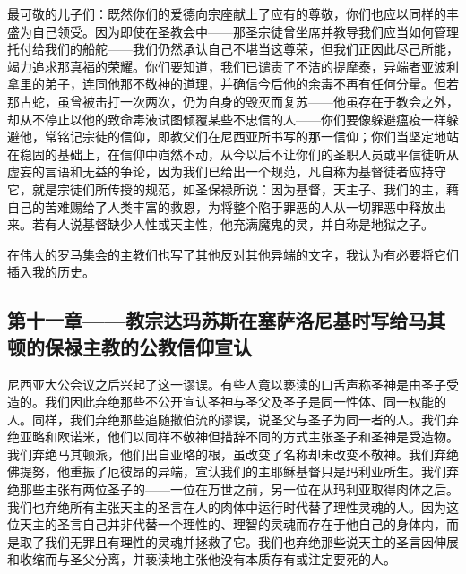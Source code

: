 最可敬的儿子们：既然你们的爱德向宗座献上了应有的尊敬，你们也应以同样的丰盛为自己领受。因为即使在圣教会中——那圣宗徒曾坐席并教导我们应当如何管理托付给我们的船舵——我们仍然承认自己不堪当这尊荣，但我们正因此尽己所能，竭力追求那真福的荣耀。你们要知道，我们已谴责了不洁的提摩泰，异端者亚波利拿里的弟子，连同他那不敬神的道理，并确信今后他的余毒不再有任何分量。但若那古蛇，虽曾被击打一次两次，仍为自身的毁灭而复苏——他虽存在于教会之外，却从不停止以他的致命毒液试图倾覆某些不忠信的人——你们要像躲避瘟疫一样躲避他，常铭记宗徒的信仰，即教父们在尼西亚所书写的那一信仰；你们当坚定地站在稳固的基础上，在信仰中岿然不动，从今以后不让你们的圣职人员或平信徒听从虚妄的言语和无益的争论，因为我们已给出一个规范，凡自称为基督徒者应持守它，就是宗徒们所传授的规范，如圣保禄所说：因为基督，天主子、我们的主，藉自己的苦难赐给了人类丰富的救恩，为将整个陷于罪恶的人从一切罪恶中释放出来。若有人说基督缺少人性或天主性，他充满魔鬼的灵，并自称是地狱之子。\par

\par

在伟大的罗马集会的主教们也写了其他反对其他异端的文字，我认为有必要将它们插入我的历史。\par


\subsection{第十一章——教宗达玛苏斯在塞萨洛尼基时写给马其顿的保禄主教的公教信仰宣认}

尼西亚大公会议之后兴起了这一谬误。有些人竟以亵渎的口舌声称圣神是由圣子受造的。我们因此弃绝那些不公开宣认圣神与圣父及圣子是同一性体、同一权能的人。同样，我们弃绝那些追随撒伯流的谬误，说圣父与圣子为同一者的人。我们弃绝亚略和欧诺米，他们以同样不敬神但措辞不同的方式主张圣子和圣神是受造物。我们弃绝马其顿派，他们出自亚略的根，虽改变了名称却未改变不敬神。我们弃绝佛提努，他重振了厄彼昂的异端，宣认我们的主耶稣基督只是玛利亚所生。我们弃绝那些主张有两位圣子的——一位在万世之前，另一位在从玛利亚取得肉体之后。我们也弃绝所有主张天主的圣言在人的肉体中运行时代替了理性灵魂的人。因为这位天主的圣言自己并非代替一个理性的、理智的灵魂而存在于他自己的身体内，而是取了我们无罪且有理性的灵魂并拯救了它。我们也弃绝那些说天主的圣言因伸展和收缩而与圣父分离，并亵渎地主张他没有本质存有或注定要死的人。\par

